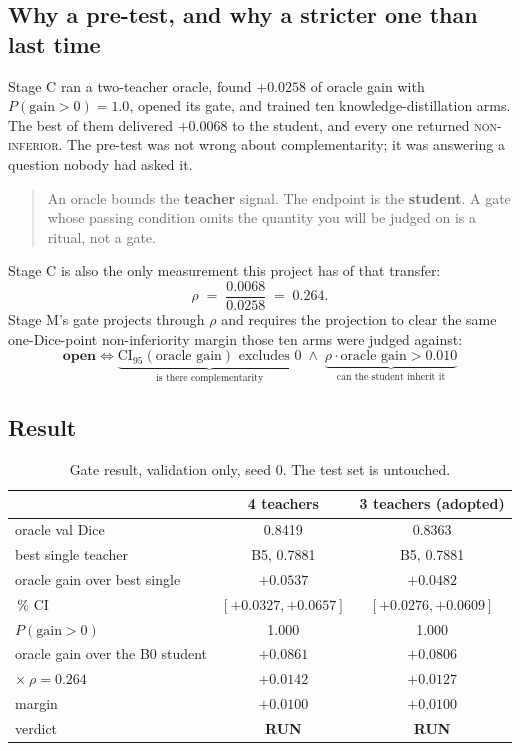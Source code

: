 \documentclass[11pt,a4paper]{article}
\newcommand{\good}[1]{\textcolor{ok}{\textbf{#1}}}
\begin{document}
\subsection{Why a pre-test, and why a stricter one than last time}

Stage C ran a two-teacher oracle, found $+0.0258$ of oracle gain with
$P(\text{gain}>0) = 1.0$, opened its gate, and trained ten knowledge-distillation
arms. The best of them delivered $+0.0068$ to the student, and every one returned
\textsc{non-inferior}. The pre-test was not wrong about complementarity; it was
answering a question nobody had asked it.

\begin{quote}
An oracle bounds the \textbf{teacher} signal. The endpoint is the
\textbf{student}. A gate whose passing condition omits the quantity you will be
judged on is a ritual, not a gate.
\end{quote}

Stage C is also the only measurement this project has of that transfer:
\[
\rho \;=\; \frac{0.0068}{0.0258} \;=\; 0.264 .
\]
Stage M's gate projects through $\rho$ and requires the projection to clear the
same one-Dice-point non-inferiority margin those ten arms were judged against:
\[
\textbf{open} \iff
\underbrace{\mathrm{CI}_{95}(\text{oracle gain}) \text{ excludes } 0}_{\text{is there complementarity}}
\;\wedge\;
\underbrace{\rho \cdot \text{oracle gain} > 0.010}_{\text{can the student inherit it}}
\]

\subsection{Result}

\begin{table}[h]
\centering
\small
\caption{Gate result, validation only, seed 0. The test set is untouched.}
\label{tab:gate}
\begin{tabular}{lcc}
\toprule
 & 4 teachers & \textbf{3 teachers (adopted)} \\
\midrule
oracle val Dice                 & 0.8419 & 0.8363 \\
best single teacher             & B5, 0.7881 & B5, 0.7881 \\
oracle gain over best single    & $+0.0537$ & $\mathbf{+0.0482}$ \\
\quad 95\,\% CI                 & $[+0.0327,+0.0657]$ & $\mathbf{[+0.0276,+0.0609]}$ \\
\quad $P(\text{gain}>0)$        & 1.000 & 1.000 \\
oracle gain over the B0 student & $+0.0861$ & $+0.0806$ \\
$\times\ \rho = 0.264$          & $+0.0142$ & $\mathbf{+0.0127}$ \\
margin                          & $+0.0100$ & $+0.0100$ \\
\midrule
verdict & \good{RUN} & \good{RUN} \\
\bottomrule
\end{tabular}
\end{table}
\end{document}
